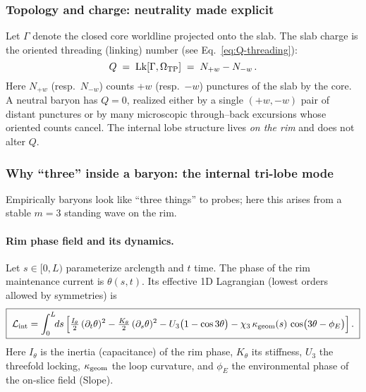 \subsubsection{Topology and charge: neutrality made explicit}
\label{sec:baryons-inside:charge}
Let $\Gamma$ denote the closed core worldline projected onto the slab.
The slab charge is the oriented threading (linking) number (see Eq.~\eqref{eq:Q-threading}):
\begin{equation}
Q \;=\; {\rm Lk}[\Gamma,\Omega_{\rm TP}] \;=\; N_{+w} - N_{-w}\,.
\label{eq:Q-neutral}
\end{equation}
Here $N_{+w}$ (resp.\ $N_{-w}$) counts +$w$ (resp.\ $-w$) punctures of the slab by the core. A neutral baryon has $Q{=}0$, realized either by a single $(+w,-w)$ pair of distant punctures or by many microscopic through--back excursions whose oriented counts cancel. The internal lobe structure lives \emph{on the rim} and does not alter $Q$.

\subsubsection{Why ``three'' inside a baryon: the internal tri-lobe mode}
\label{sec:baryons-inside:three}
Empirically baryons look like ``three things'' to probes; here this arises from a stable $m{=}3$ standing wave on the rim.

\paragraph{Rim phase field and its dynamics.}
Let $s\!\in\![0,L)$ parameterize arclength and $t$ time. The phase of the rim maintenance current is $\theta(s,t)$.
Its effective 1D Lagrangian (lowest orders allowed by symmetries) is
\begin{equation}
\boxed{\;
\mathcal L_{\rm int}
= \int_{0}^{L}\!\!ds\,
\Big[
\tfrac{I_\theta}{2}\,(\partial_t\theta)^2
- \tfrac{K_\theta}{2}\,(\partial_s\theta)^2
- U_3\big(1-\cos 3\theta\big)
- \chi_3\,\kappa_{\rm geom}(s)\,\cos\!\big(3\theta-\phi_E\big)
\Big]\,.
\;}
\label{eq:L_int}
\end{equation}
Here $I_\theta$ is the inertia (capacitance) of the rim phase, $K_\theta$ its stiffness, $U_3$ the threefold locking, $\kappa_{\rm geom}$ the loop curvature, and $\phi_E$ the environmental phase of the on-slice field (Slope).

